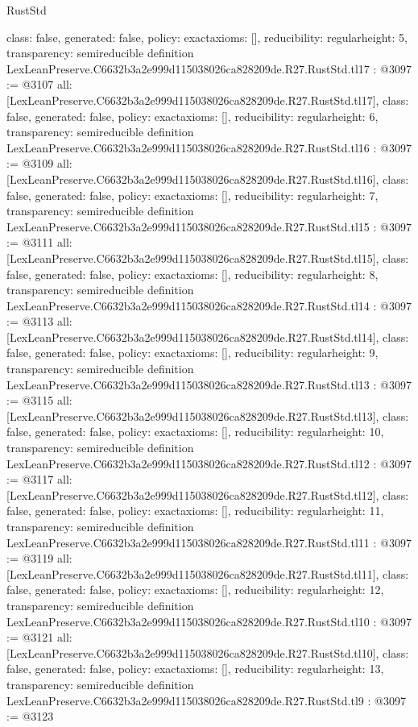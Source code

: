 \begin{lexlean}{RustStd}
\begin{coremodule}
{  class: false,
  generated: false,
  policy: exact{axioms: []},
  reducibility: regular{height: 5},
  transparency: semireducible
}
definition LexLeanPreserve.C6632b3a2e999d115038026ca828209de.R27.RustStd.tl17 : @3097 := @3107 {
  all: [LexLeanPreserve.C6632b3a2e999d115038026ca828209de.R27.RustStd.tl17],
  class: false,
  generated: false,
  policy: exact{axioms: []},
  reducibility: regular{height: 6},
  transparency: semireducible
}
definition LexLeanPreserve.C6632b3a2e999d115038026ca828209de.R27.RustStd.tl16 : @3097 := @3109 {
  all: [LexLeanPreserve.C6632b3a2e999d115038026ca828209de.R27.RustStd.tl16],
  class: false,
  generated: false,
  policy: exact{axioms: []},
  reducibility: regular{height: 7},
  transparency: semireducible
}
definition LexLeanPreserve.C6632b3a2e999d115038026ca828209de.R27.RustStd.tl15 : @3097 := @3111 {
  all: [LexLeanPreserve.C6632b3a2e999d115038026ca828209de.R27.RustStd.tl15],
  class: false,
  generated: false,
  policy: exact{axioms: []},
  reducibility: regular{height: 8},
  transparency: semireducible
}
definition LexLeanPreserve.C6632b3a2e999d115038026ca828209de.R27.RustStd.tl14 : @3097 := @3113 {
  all: [LexLeanPreserve.C6632b3a2e999d115038026ca828209de.R27.RustStd.tl14],
  class: false,
  generated: false,
  policy: exact{axioms: []},
  reducibility: regular{height: 9},
  transparency: semireducible
}
definition LexLeanPreserve.C6632b3a2e999d115038026ca828209de.R27.RustStd.tl13 : @3097 := @3115 {
  all: [LexLeanPreserve.C6632b3a2e999d115038026ca828209de.R27.RustStd.tl13],
  class: false,
  generated: false,
  policy: exact{axioms: []},
  reducibility: regular{height: 10},
  transparency: semireducible
}
definition LexLeanPreserve.C6632b3a2e999d115038026ca828209de.R27.RustStd.tl12 : @3097 := @3117 {
  all: [LexLeanPreserve.C6632b3a2e999d115038026ca828209de.R27.RustStd.tl12],
  class: false,
  generated: false,
  policy: exact{axioms: []},
  reducibility: regular{height: 11},
  transparency: semireducible
}
definition LexLeanPreserve.C6632b3a2e999d115038026ca828209de.R27.RustStd.tl11 : @3097 := @3119 {
  all: [LexLeanPreserve.C6632b3a2e999d115038026ca828209de.R27.RustStd.tl11],
  class: false,
  generated: false,
  policy: exact{axioms: []},
  reducibility: regular{height: 12},
  transparency: semireducible
}
definition LexLeanPreserve.C6632b3a2e999d115038026ca828209de.R27.RustStd.tl10 : @3097 := @3121 {
  all: [LexLeanPreserve.C6632b3a2e999d115038026ca828209de.R27.RustStd.tl10],
  class: false,
  generated: false,
  policy: exact{axioms: []},
  reducibility: regular{height: 13},
  transparency: semireducible
}
definition LexLeanPreserve.C6632b3a2e999d115038026ca828209de.R27.RustStd.tl9 : @3097 := @3123 {
}
\end{coremodule}
\end{lexlean}
